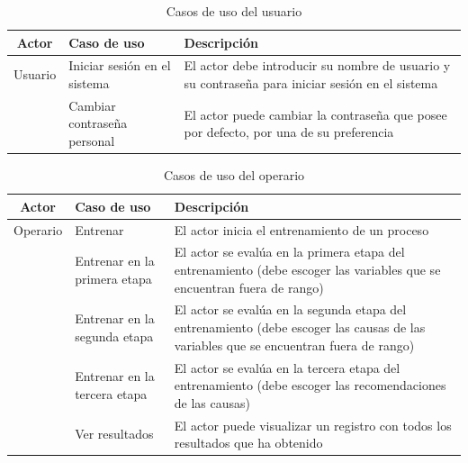 \begin{table}[H]
\begin{center}
\begin{tabular}{ | c | p{3.8cm} |  p{8cm} |}
\hline
\textbf{Actor} & \textbf{Caso de uso} & \textbf{Descripción}\\
\hline
Usuario & Iniciar sesión en el sistema & El actor debe introducir su nombre de usuario y su contraseña para iniciar sesión en el sistema \\
\cline{2-3}
& Cambiar contraseña personal  & El actor puede cambiar la contraseña que posee por defecto, por una de su preferencia \\
\hline
\end{tabular}
\caption{Casos de uso del usuario}
\end{center}
\end{table}

\begin{table}[H]
\begin{center}
\begin{tabular}{ | c | p{3cm} |  p{8.5cm} |}
\hline
\textbf{Actor} & \textbf{Caso de uso} & \textbf{Descripción}\\
\hline
Operario & Entrenar & El actor inicia el entrenamiento de un proceso \\
\cline{2-3}
& Entrenar en la primera etapa & El actor se evalúa en la primera etapa del entrenamiento (debe escoger las variables que se encuentran fuera de rango) \\
\cline{2-3}
& Entrenar en la segunda etapa & El actor se evalúa en la segunda etapa del entrenamiento (debe escoger las causas de las variables que se encuentran fuera de rango) \\
\cline{2-3}
& Entrenar en la tercera etapa & El actor se evalúa en la tercera etapa del entrenamiento (debe escoger las recomendaciones de las causas) \\
\cline{2-3}
& Ver resultados & El actor puede visualizar un registro con todos los resultados que ha obtenido \\
\hline
\end{tabular}
\caption{Casos de uso del operario}
\end{center}
\end{table}

